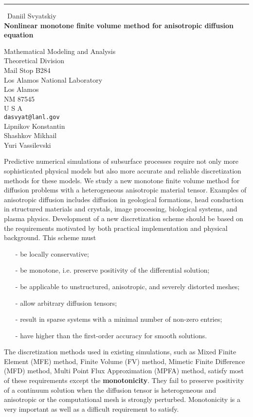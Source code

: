 \documentclass{report}
\begin{document}
\begin{center}
\rule{6in}{1pt} \
{\large Daniil Svyatskiy \\
{\bf Nonlinear monotone finite volume method for anisotropic diffusion equation}}

Mathematical Modeling and Analysis \\ Theoretical Division \\ Mail Stop B284 \\ Los Alamos National Laboratory \\ Los Alamos \\ NM 87545 \\ U S A
\\
{\tt dasvyat@lanl.gov}\\
Lipnikov Konstantin\\
Shashkov Mikhail\\
	Yuri Vassilevski\end{center}

Predictive numerical simulations of subsurface processes require
not only more sophisticated physical models but also more accurate
and reliable discretization methods for these models.
We study a new monotone finite volume method
for diffusion problems with a heterogeneous anisotropic material tensor. Examples of
anisotropic diffusion includes diffusion in geological formations,
head conduction in structured materials and crystals, image processing,
biological systems, and plasma physics.
Development of a new discretization scheme should be based on the
requirements motivated by both practical implementation and physical
background. This scheme must

\begin{itemize}
\item[-] be locally conservative;
\item[-] be monotone, i.e. preserve positivity of the differential solution;
\item[-] be applicable to unstructured, anisotropic, and severely distorted meshes;
\item[-] allow arbitrary diffusion tensors;
\item[-] result in sparse systems with a minimal number of non-zero entries;
\item[-] have higher than the first-order accuracy for smooth solutions.
\end{itemize}

The discretization
methods used in existing simulations, such as Mixed Finite Element (MFE)
method, Finite Volume (FV) method,
Mimetic Finite Difference (MFD) method, Multi Point Flux Approximation (MPFA) method,
satisfy most of these requirements except the {\bf monotonicity}. They
fail to preserve positivity of a
continuum solution when the diffusion tensor is heterogeneous and
anisotropic or the computational mesh is strongly
perturbed.
Monotonicity is a very important as well as a difficult requirement to satisfy.
\end{document}
